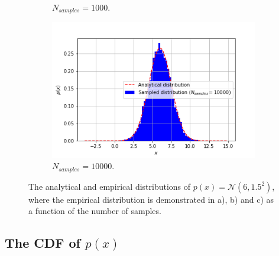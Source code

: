 \documentclass{article}
\begin{document}
\begin{figure}[!htb]
\begin{subfigure}[b]{0.3\textwidth}
         \caption{$N_{samples} = 1000$.}
     \end{subfigure}
     \hfill
     \begin{subfigure}[b]{0.3\textwidth}
         \centering
         \includegraphics[width=\textwidth]{Q1a_fig3.png}
         \caption{$N_{samples} = 10 000$.}
     \end{subfigure}
        \caption{The analytical and empirical distributions of $p(x) = \mathcal{N}(6, 1.5^2)$, where the empirical distribution is demonstrated in a), b) and c) as a function of the number of samples.}
        \label{fig:Q1a_1}
\end{figure}

\subsection{The CDF of $p(x)$}
\end{document}
